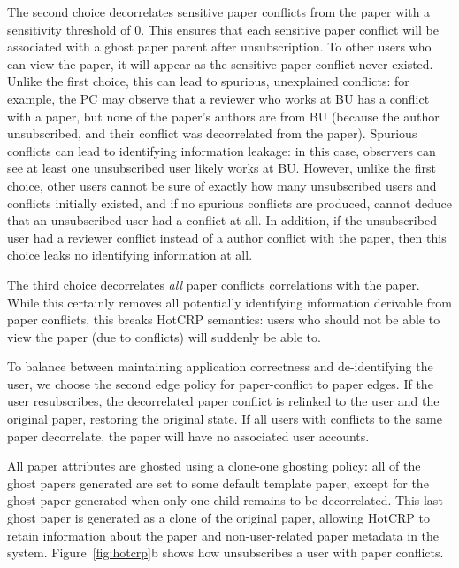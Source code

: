 The second choice decorrelates sensitive paper conflicts from the paper with a sensitivity threshold
of 0. This ensures that each sensitive paper conflict will be associated with a ghost paper parent
after unsubscription. To other users who can view the paper, it will appear as the sensitive paper
conflict never existed. Unlike the first choice, this can lead to spurious, unexplained conflicts:
for example, the PC may observe that a reviewer who works at BU has a conflict with a paper, but
none of the paper's authors are from BU (because the author unsubscribed, and their conflict was
decorrelated from the paper). Spurious conflicts can lead to identifying information leakage: in
this case, observers can see at least one unsubscribed user likely works at BU. However, unlike the
first choice, other users cannot be sure of exactly how many unsubscribed users and conflicts
initially existed, and if no spurious conflicts are produced, cannot deduce that an unsubscribed
user had a conflict at all. In addition, if the unsubscribed user had a reviewer conflict instead of
a author conflict with the paper, then this choice leaks no identifying information at all.

The third choice decorrelates \emph{all} paper conflicts correlations with the paper. While this
certainly removes all potentially identifying information derivable from paper conflicts, this
breaks HotCRP semantics: users who should not be able to view the paper (due to conflicts) will
suddenly be able to.

To balance between maintaining application correctness and de-identifying the user, we choose the
second edge policy for paper-conflict to paper edges.
If the user resubscribes, the decorrelated paper conflict is relinked to the user and the original
paper, restoring the original state.  If all users with conflicts to the same paper decorrelate, the
paper will have no associated user accounts.

All paper attributes are ghosted using a clone-one ghosting policy: all of the ghost papers
generated are set to some default template paper, except for the ghost paper generated when only one
child remains to be decorrelated.  This last ghost paper is generated as a clone of the original
paper, allowing HotCRP to retain information about the paper and non-user-related paper metadata in
the system.  
Figure~\ref{fig:hotcrp}b shows how \sys unsubscribes a user with paper conflicts. 

